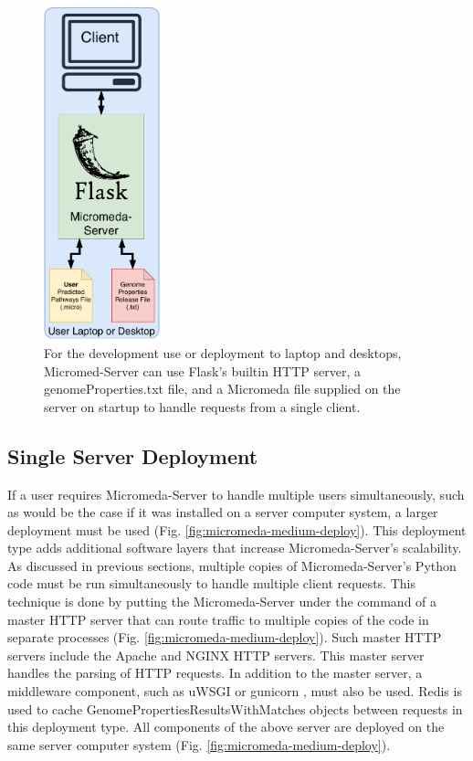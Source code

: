 \begin{figure}[!ht]
  \centering
	\includegraphics[width=0.30\textwidth]{media/micromeda-simple-deployment.pdf}
	 \caption{For the development use or deployment to laptop and desktops, Micromed-Server can use Flask's builtin HTTP server, a genomeProperties.txt file, and a Micromeda file supplied on the server on startup to handle requests from a single client.}
	 \label{fig:micromeda-small-deploy}
\end{figure}

\subsection{Single Server Deployment} \label{single-server-micromeda-deployment}

If a user requires Micromeda-Server to handle multiple users simultaneously, such as would be the case if it was installed on a server computer system, a larger deployment must be used (Fig. \ref{fig:micromeda-medium-deploy}). This deployment type adds additional software layers that increase Micromeda-Server's scalability. As discussed in previous sections, multiple copies of Micromeda-Server's Python code must be run simultaneously to handle multiple client requests. This technique is done by putting the Micromeda-Server under the command of a master HTTP server that can route traffic to multiple copies of the code in separate processes (Fig. \ref{fig:micromeda-medium-deploy}). Such master HTTP servers include the Apache \cite{fielding1997apache} and NGINX \cite{reese2008nginx} HTTP servers. This master server handles the parsing of HTTP requests. In addition to the master server, a middleware component, such as uWSGI \cite{2019uwsgi} or gunicorn \cite{chesneau_2018}, must also be used. Redis is used to cache GenomePropertiesResultsWithMatches objects between requests in this deployment type. All components of the above server are deployed on the same server computer system (Fig. \ref{fig:micromeda-medium-deploy}).

